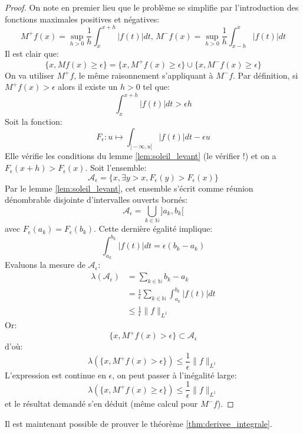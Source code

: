\begin{proof}
On note en premier lieu que le problème se simplifie par l'introduction des
fonctions maximales positives et négatives:
\[
M^+f(x)= \sup_{h > 0} \frac{1}{h} \int_x^{x+h} |f(t)| dt, \, M^-f(x)= \sup_{h >
0} \frac{1}{h} \int_{x-h}^x |f(t)| dt
\]
Il est clair que:
\[
\{x , Mf(x) \geq \epsilon \} = \{x , M^+f(x) \geq \epsilon \}\cup \{x , M^-f(x)
\geq \epsilon \}
\]
On va utiliser $M^+f$, le même raisonnement s'appliquant à $M^-f$. Par
définition, si $M^+f(x) > \epsilon$ alors il existe un $h > 0$ tel que:
\[
\int_x^{x+h} |f(t)| dt > \epsilon h
\]
Soit la fonction:
\[
F_\epsilon \colon u \mapsto \int_{]-\infty,u[} |f(t)|dt - \epsilon u
\]
Elle vérifie les conditions du lemme \ref{lem:soleil_levant} (le vérifier !) et
on a $F_\epsilon(x+h) > F_{\epsilon}(x)$. Soit l'ensemble:
\[
\mathcal{A}_\epsilon = \{ x, \exists y > x, F_\epsilon(y) > F_\epsilon(x) \} 
\]
Par le lemme \ref{lem:soleil_levant}, cet ensemble s'écrit comme réunion
dénombrable disjointe d'intervalles ouverts bornés:
\[
\mathcal{A}_\epsilon = \bigcup_{k \in \mathbb{N}}]a_k,b_k[
\]
avec $F_\epsilon(a_k)=F_\epsilon(b_k)$. Cette dernière égalité implique:
\[
\int_{a_k}^{b_k} |f(t)|dt = \epsilon (b_k - a_k)
\]
Evaluons la mesure de $\mathcal{A}_\epsilon$:
\begin{align*}
\lambda \left (\mathcal{A}_\epsilon \right) & = \sum_{k \in \mathbb{N}} b_k -
a_k
\\
&= \frac{1}{\epsilon} \sum_{k \in \mathbb{N}} \int_{a_k}^{b_k}|f(t)|dt \\
& \leq \frac{1}{\epsilon}\|f\|_{L^1}
\end{align*}
Or:
\[
\{x , M^+f(x) > \epsilon \} \subset  \mathcal{A}_\epsilon
\]
d'où:
\[
\lambda \left( \{x , M^+f(x) > \epsilon \} \right) \leq
\frac{1}{\epsilon}\|f\|_{L^1}
\]
L'expression est continue en $\epsilon$, on peut passer à l'inégalité large:
\[
\lambda \left( \{x , M^+f(x) \geq \epsilon \} \right) \leq
\frac{1}{\epsilon}\|f\|_{L^1}
\]
et le résultat demandé s'en déduit (même calcul pour $M^-f$).
\end{proof}
Il est maintenant possible de prouver le théorème \ref{thm:derivee_integrale}.
